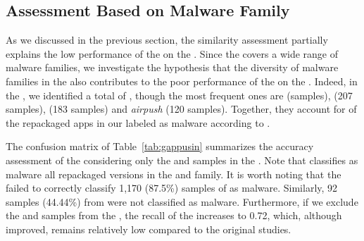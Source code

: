 \subsection{Assessment Based on Malware Family}


As we discussed in the previous
section, the similarity assessment partially explains the low performance of the
\mas on the \cds. Since the \cds covers a wide range of malware families, we investigate the
hypothesis that the diversity of malware families in
the \cds also contributes to
the poor performance of the \mas on the \cds.
Indeed, in the \cds, we identified a total of
, though the most frequent
ones are \gps (\appsGps samples),  (207 samples),  (183 samples) and \emph{airpush} (120 samples). Together, they
account for  of the repackaged apps in our \cds labeled as malware according to \vt.




The confusion matrix of Table~\ref{tab:gappusin} summarizes the accuracy assessment of the \mas considering
only the \gps and  samples in the \cds. Note that \vt classifies as malware all repackaged versions in the \gps and 
family. It is worth noting that the \mas failed to correctly classify
1,170 (87.5\%) samples of \gps as malware. Similarly,
92 samples (44.44\%) from  were not classified as malware.
Furthermore, if we exclude the \gps and  samples from the \cds,
the recall of the \mas increases to 0.72, which, although improved, remains relatively low compared to the original studies.


